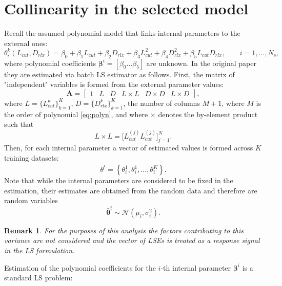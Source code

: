 \documentclass[a4paper,11pt,twoside]{article}
\theoremstyle{mytheoremstyle}
\newtheorem{remark}{Remark}[section]
\begin{document}
\section{Collinearity in the selected model}
\par Recall the assumed polynomial model that links internal parameters to the external ones:
\begin{equation}\label{eq:polyn}
\theta^{k}_{i}(L_{cut},D_{rlx}) = \beta_0 + \beta_1 L_{cut} + \beta_2 D_{rlx} + \beta_3 L_{cut}^{2} + \beta_4 D_{rlx}^{2} + \beta_5 L_{cut} D_{rlx}, \qquad i=1,\dots,N_s,
\end{equation}
where polynomial coefficients $\mathbf{\beta}^i = \left[ \beta_0 \dots \beta_5 \right]$ are unknown. In the original paper \cite{Wei2008} they are estimated via batch LS estimator as follows. First, the matrix of "independent" variables is formed from the external parameter values:
\begin{equation}
\mathbf{A} = \left[\begin{array}{cccccc}
1 & L& D& L\times L& D\times D& L\times D
\end{array}\right],
\end{equation}
where $L = \{L_{cut}^{k}\}^{K}_{k=1}$, $D = \{D_{rlx}^{k}\}^{K}_{k=1}$, the number of columns $M + 1$, where $M$ is the order of polynomial \eqref{eq:polyn}, and where $\times$ denotes the by-element product such that
\begin{equation*}
L\times L = \Big[ L_{cut}^{(j)} L_{cut}^{(j)}\Big]^{N}_{j=1}.
\end{equation*}
Then, for each internal parameter a vector of estimated values is formed across $K$ training datasets:
\begin{equation*}
\bar{\theta}^i = \left\{ \theta^{1}_{i}, \theta^{1}_{i}, \dots, \theta^{K}_{i} \right\}.
\end{equation*}
Note that while the internal parameters are considered to be fixed in the estimation, their estimates are obtained from the random data and therefore are random variables 
\begin{equation*}
\bar{\mathbf{\theta}}^i \sim \mathcal{N}(\mu_i, \sigma^{2}_{i}).
\end{equation*}
\begin{remark}
For the purposes of this analysis the factors contributing to this variance are not considered and the vector of LSEs is treated as a response signal in the LS formulation.
\end{remark}
Estimation of the polynomial coefficients for the $i$-th internal parameter $\mathbf{\beta}^i$ is a standard LS problem:
\end{document}
